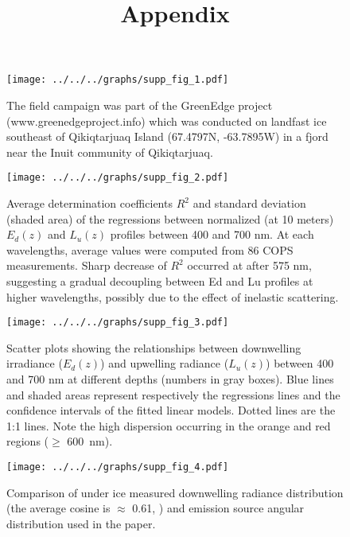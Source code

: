 \documentclass[12pt,a4paper]{scrartcl}
\title{Appendix}
\date{}
\newcommand{\edz}{\ensuremath{{E_d(z)}}}
\newcommand{\luz}{\ensuremath{{L_u(z)}}}
\begin{document}
\maketitle

\begin{figure}[h]
	\centering
	\texttt{[image: ../../../graphs/supp\_fig\_1.pdf]}
	\caption{The field campaign was part of the GreenEdge project (www.greenedgeproject.info)  which was conducted on landfast ice southeast of Qikiqtarjuaq Island (67.4797N, -63.7895W) in a fjord near the Inuit community of Qikiqtarjuaq.}
\end{figure}

\clearpage
\newpage

\begin{figure}[h]
	\centering
	\texttt{[image: ../../../graphs/supp\_fig\_2.pdf]}
	\caption{Average determination coefficients \(R^2\) and standard deviation (shaded area) of the regressions between normalized (at 10 meters) \edz{} and \luz{} profiles between 400 and 700 nm. At each wavelengths, average values were computed from 86 COPS measurements. Sharp decrease of \(R^2\) occurred at after 575 nm, suggesting a gradual decoupling between Ed and Lu profiles at higher wavelengths, possibly due to the effect of inelastic scattering.}
\end{figure}

\clearpage
\newpage

\begin{figure}[h]
	\centering
	\texttt{[image: ../../../graphs/supp\_fig\_3.pdf]}
	\caption{Scatter plots showing the relationships between downwelling irradiance (\edz{}) and upwelling radiance (\luz{}) between 400 and 700 nm at different depths (numbers in gray boxes). Blue lines and shaded areas represent respectively the regressions lines and the confidence intervals of the fitted linear models. Dotted lines are the 1:1 lines. Note the high dispersion occurring in the orange and red regions ($\ge$ 600~nm).}
\end{figure}

\clearpage
\newpage

\begin{figure}[h]
	\centering
	\texttt{[image: ../../../graphs/supp\_fig\_4.pdf]}
	\caption{Comparison of under ice measured downwelling radiance distribution (the average cosine is $\approx$ 0.61, \cite{Girard2018}) and emission source angular distribution used in the paper.}
\end{figure}
\end{document}
